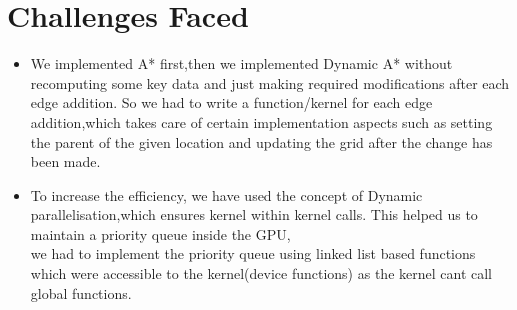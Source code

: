 \documentclass[12pt]{article}
\begin{document}
\section{Challenges Faced}
\begin{itemize}
    \item We implemented A* first,then we implemented Dynamic A* without recomputing some key data and just making required modifications after each edge addition.
    So we had to write a function/kernel for each edge addition,which takes care of certain implementation aspects such as setting the parent of the given location and updating the grid after the change has been made. 
    \item To increase the efficiency, we have used the concept of Dynamic parallelisation,which ensures kernel within kernel calls.
    This helped us to maintain a priority queue inside the GPU,\\
    we had to implement the priority queue using linked list based functions which were accessible to the kernel(device functions) as the kernel cant call global functions.
\end{itemize}
\end{document}

